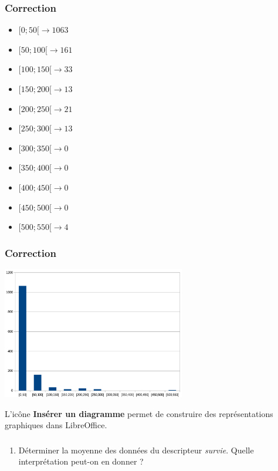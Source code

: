 \documentclass[svgnames,11pt]{beamer}
\begin{document}
\begin{frame}
    \frametitle{Correction}

    \begin{itemize}
        \item $[0;50[ \rightarrow 1063$
        \item $[50;100[ \rightarrow 161$
        \item $[100;150[ \rightarrow 33$
        \item $[150;200[ \rightarrow 13$
        \item $[200;250[ \rightarrow 21$
        \item $[250;300[ \rightarrow 13$
        \item $[300;350[ \rightarrow 0$
        \item $[350;400[ \rightarrow 0$
        \item $[400;450[ \rightarrow 0$
        \item $[450;500[ \rightarrow 0$
        \item $[500;550[ \rightarrow 4$
    \end{itemize}

\end{frame}
\begin{frame}
    \frametitle{Correction}

    \begin{center}
    \centering
    \includegraphics[width=8cm]{ressources/diagramme.png}
    \end{center}
\begin{aretenir}[]
L'icône \textbf{Insérer un diagramme} permet de construire des représentations graphiques dans LibreOffice.
\end{aretenir}
\end{frame}
\begin{frame}
    \frametitle{}

    \begin{activite}
    \begin{enumerate}
        \item Déterminer la moyenne des données du descripteur \emph{survie}. Quelle interprétation peut-on en donner ?
    \end{enumerate}
    \end{activite}

\end{frame}
\end{document}
